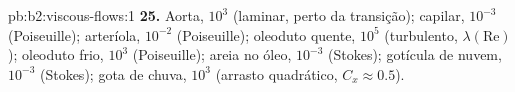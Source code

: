 \begin{solution}{pb:b2:viscous-flows:1}
\textbf{25.} Aorta, $10^3$ (laminar, perto da transição); capilar, $10^{-3}$
(Poiseuille); arteríola, $10^{-2}$ (Poiseuille); oleoduto quente, $10^5$
(turbulento, $\lambda(\mathrm{Re})$); oleoduto frio, $10^3$ (Poiseuille); areia no
óleo, $10^{-3}$ (Stokes); gotícula de nuvem, $10^{-3}$ (Stokes); gota de chuva, $10^3$
(arrasto quadrático, $C_x \approx 0.5$).
\end{solution}
